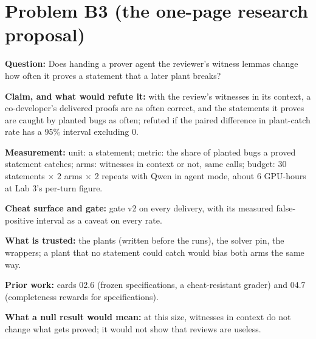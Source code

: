 \documentclass[11pt]{article}
\begin{document}
\section*{Problem B3 (the one-page research proposal)}\label{ans:B3}
\begin{answer}
\textbf{Question:} Does handing a prover agent the reviewer's witness lemmas
change how often it proves a statement that a later plant breaks?

\textbf{Claim, and what would refute it:} with the review's witnesses in its
context, a co-developer's delivered proofs are as often correct, and the
statements it proves are caught by planted bugs as often; refuted if the
paired difference in plant-catch rate has a 95\% interval excluding 0.

\textbf{Measurement:} unit: a statement; metric: the share of planted bugs a
proved statement catches; arms: witnesses in context or not, same calls;
budget: 30 statements $\times$ 2 arms $\times$ 2 repeats with Qwen in agent
mode, about 6 GPU-hours at Lab 3's per-turn figure.

\textbf{Cheat surface and gate:} gate v2 on every delivery, with its measured
false-positive interval as a caveat on every rate.

\textbf{What is trusted:} the plants (written before the runs), the solver
pin, the wrappers; a plant that no statement could catch would bias both
arms the same way.

\textbf{Prior work:} cards 02.6 (frozen specifications, a cheat-resistant
grader) and 04.7 (completeness rewards for specifications).

\textbf{What a null result would mean:} at this size, witnesses in context
do not change what gets proved; it would not show that reviews are useless.
\end{answer}

\end{document}
